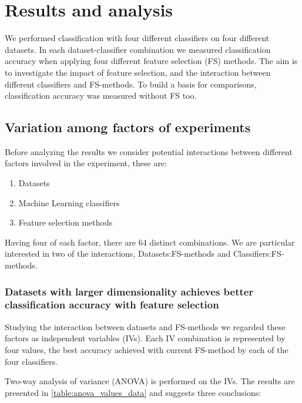 \chapter{Results and analysis}

We performed classification with four different classifiers on four different datasets. In each dataset-classifier combination we measured classification accuracy when applying four different feature selection (FS) methods. The aim is to investigate the impact of feature selection, and the interaction between different classifiers and FS-methods. To build a basis for comparisons, classification accuracy was measured without FS too.

\section{Variation among factors of experiments}
\label{Variation_among_factors}

Before analyzing the results we consider potential interactions between different factors involved in the experiment, these are:

\begin{enumerate}
  \item Datasets
  \item Machine Learning classifiers
  \item Feature selection methods
\end{enumerate}

Having four of each factor, there are 64 distinct combinations. We are particular interested in two of the interactions, Datasets:FS-methods and Classifiers:FS-methods.

\subsection{Datasets with larger dimensionality achieves better classification accuracy with feature selection}

Studying the interaction between datasets and FS-methods we regarded these factors as independent variables (IVs). Each IV combination is represented by four values, the best accuracy achieved with current FS-method by each of the four classifiers.

Two-way analysis of variance (ANOVA) is performed on the IVs. The results are presented in \ref{table:anova_values_data} and suggests three conclusions:



